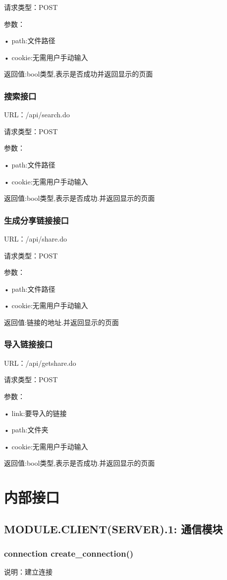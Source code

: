 请求类型：POST

参数： 

• path:文件路径

• cookie:无需用户手动输入

返回值:bool类型,表示是否成功并返回显示的页面

\subsubsection{搜索接口}
URL：/api/search.do

请求类型：POST

参数： 

• path:文件路径

• cookie:无需用户手动输入

返回值:bool类型,表示是否成功.并返回显示的页面

\subsubsection{生成分享链接接口}
URL：/api/share.do

请求类型：POST

参数： 

• path:文件路径

• cookie:无需用户手动输入

返回值:链接的地址.并返回显示的页面

\subsubsection{导入链接接口}
URL：/api/getshare.do

请求类型：POST

参数： 

• link:要导入的链接

• path:文件夹

• cookie:无需用户手动输入

返回值:bool类型,表示是否成功.并返回显示的页面


\section{内部接口}

\subsection{MODULE.CLIENT(SERVER).1: 通信模块}

\subsubsection{connection create\_connection()}
说明：建立连接

